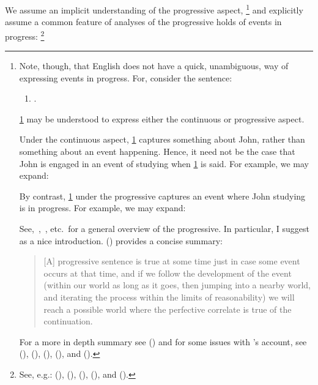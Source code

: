 \begin{note}
  \noindent%
  We assume an implicit understanding of the progressive aspect,%
  \footnote{
    \nocite{Portner:1998um}
    \nocite{Engelberg:1999vi}
    Note, though, that English does not have a quick, unambiguous, way of expressing events in progress.
    For, consider the sentence:
    \begin{enumerate}[label=\arabic*., ref=(\arabic*)]
    \item
      \label{prog:abmig}
      .
    \end{enumerate}
    \ref{prog:abmig} may be understood to express either the continuous or progressive aspect.

    Under the continuous aspect, \ref{prog:abmig} captures something about John, rather than something about an event happening.
    Hence, it need not be the case that John is engaged in an event of studying when \ref{prog:abmig} is said.
    For example, we may expand:

    By contrast, \ref{prog:abmig} under the progressive captures an event where John studying is in progress.
    For example, we may expand:

    See,~\textcite{Richards:1981wo},~\textcite{Portner:2011vi}, etc.\ for a general overview of the progressive.
    In particular, I suggest \textcite{Landman:1992wh} as a nice introduction.
    \citeauthor{Szabo:2004ul} (\citeyear[34]{Szabo:2004ul}) provides a concise summary:
    \begin{quote}
      [A] progressive sentence is true at some time just in case some event occurs at that time, and if we follow the development of the event (within our world as long as it goes, then jumping into a nearby world, and iterating the process within the limits of reasonability) we will reach a possible world where the perfective correlate is true of the continuation.
    \end{quote}
    For a more in depth summary see (\cite[764--766]{Portner:1998um}) and for some issues with \citeauthor{Landman:1992wh}'s account, see
    (\cite{Bonomi:1997uq}),
    (\cite[49--50]{Engelberg:1999vi}),
    (\cite[35]{Szabo:2004ul}),
    (\cite[767]{Portner:1998um}),
    and (\cite[1256]{Portner:2011vi}).
  }
  and explicitly assume a common feature of analyses of the progressive holds of events in progress:%
  \footnote{
    See, e.g.:
    (\cite{Bennett:1972uw}),
    (\cite{Dowty:1979vq}),
    (\cite{Parsons:1990aa}),
    (\cite{Landman:1992wh}), and
    (\cite{Portner:1998um}).

}
\end{note}
